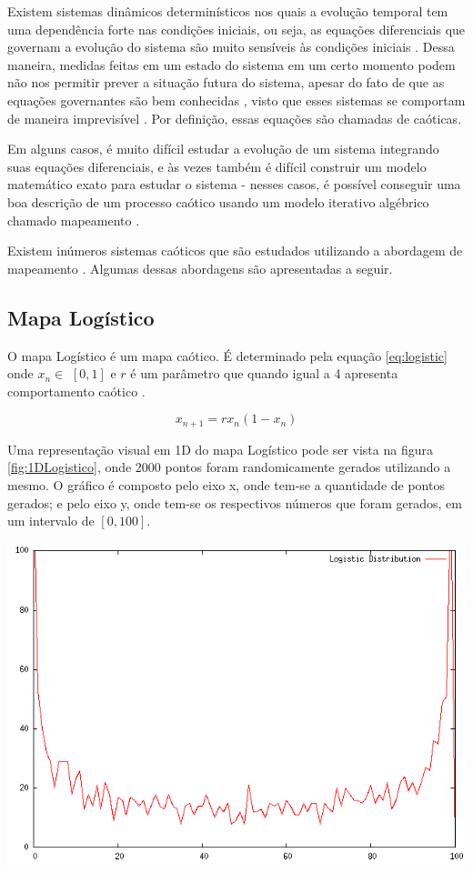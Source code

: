
Existem sistemas dinâmicos determinísticos nos quais a evolução temporal tem uma dependência forte nas condições iniciais, ou seja, as equações diferenciais que governam a evolução do sistema são muito sensíveis às condições iniciais \cite{cattani}. Dessa maneira, medidas feitas em um estado do sistema em um certo momento podem não nos permitir prever a situação futura do sistema, apesar do fato de que as equações governantes são bem conhecidas \cite{cattani}, visto que esses sistemas se comportam de maneira imprevisível \cite{fister}. Por definição, essas equações são chamadas de caóticas.

Em alguns casos, é muito difícil estudar a evolução de um sistema integrando suas equações diferenciais, e às vezes também é difícil construir um modelo matemático exato para estudar o sistema - nesses casos, é possível conseguir uma boa descrição de um processo caótico usando um modelo iterativo algébrico chamado mapeamento \cite{cattani}.

Existem inúmeros sistemas caóticos que são estudados utilizando a abordagem de mapeamento \cite{cattani}. Algumas dessas abordagens são apresentadas a seguir.

\subsection{Mapa Logístico}
O mapa Logístico é um mapa caótico. É determinado pela equação \ref{eq:logistic} onde $x_{n} \in$ $[0, 1]$ e $r$ é um parâmetro que quando igual a 4 apresenta comportamento caótico \cite{fister}.

\begin{equation}
\label{eq:logistic}
x_{n + 1} = r x_{n} (1 - x_{n})
\end{equation}

Uma representação visual em 1D do mapa Logístico pode ser vista na figura \ref{fig:1DLogistico}, onde 2000 pontos foram randomicamente gerados utilizando a mesmo. O gráfico é composto pelo eixo x, onde tem-se a quantidade de pontos gerados; e pelo eixo y, onde tem-se os respectivos números que foram gerados, em um intervalo de $[0, 100]$.

{
    \centering
    \includegraphics[width=0.55\linewidth]{figuras/DistribuicaoLogistica.png}
    \label{fig:1DLogistico}
}

